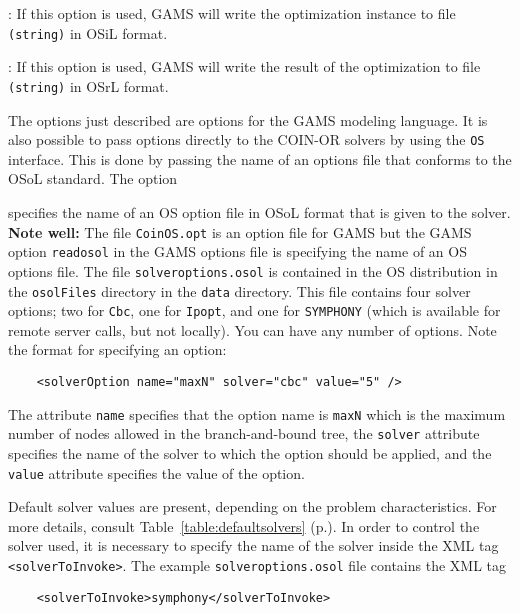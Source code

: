 \vskip 8pt
:  If this option is used, GAMS will write the optimization instance 
to file {\tt (string)} in    OSiL   format.
\vskip 8pt

\vskip 8pt
:  If this option is used, GAMS will write the result of the optimization 
to file {\tt (string)} in OSrL  format.
\vskip 8pt

The options just described are options for the GAMS modeling language.  
It is also possible to pass options directly to the COIN-OR solvers by using the {\tt OS} interface.
This is done by passing the name of an options file that conforms to the  OSoL  standard.  
The option

\vskip 8pt
  specifies the name of an OS option  file in OSoL format that is 
given to the solver.  {\bf Note well:} The file  {\tt CoinOS.opt} is an option  file for GAMS but the GAMS option 
{\tt readosol} in the GAMS options file  is specifying the name of an OS options file. 
\vskip 8pt
The file {\tt solveroptions.osol} is contained in the OS distribution in the {\tt osolFiles} directory   
in the {\tt data} directory. This file contains four solver options; two for {\tt Cbc}, one for {\tt Ipopt},
and one for {\tt SYMPHONY} (which is available for remote server calls, but not locally).  
You can have any number of options. Note the format for specifying an option:
\begin{verbatim}
    <solverOption name="maxN" solver="cbc" value="5" />
\end{verbatim}
The attribute {\tt name} specifies that the option name is {\tt maxN} which is the maximum number of nodes 
allowed in the branch-and-bound tree, the {\tt solver} attribute specifies the name of the solver to which
the option should be applied, and the {\tt value} attribute specifies the value of the option. 

Default solver values are present, depending on the problem characteristics. For more details, consult 
Table~\ref{table:defaultsolvers} (p.\pageref{table:defaultsolvers}).
In order to control the solver used, it is necessary to specify the name of the solver
inside the XML tag {\tt <solverToInvoke>}. The example  {\tt solveroptions.osol} file contains the XML tag
\begin{verbatim}
    <solverToInvoke>symphony</solverToInvoke>
\end{verbatim}

